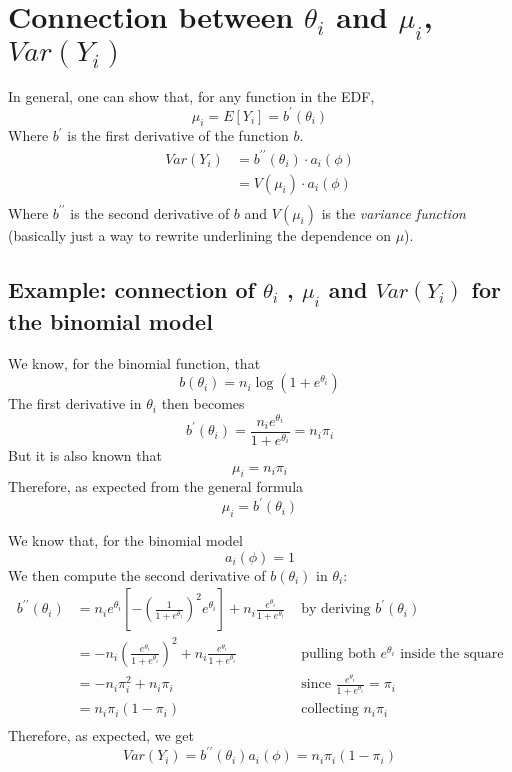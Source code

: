   \section{Connection between \texorpdfstring{$\theta_i$}{thetai} and \texorpdfstring{$\mu_i$}{mui}, \texorpdfstring{$Var(Y_i)$}{varyi}}
    In general, one can show that, for any function in the EDF,
    $$\mu_i = E[Y_i] = b^\prime(\theta_i)$$
    Where $b^\prime$ is the first derivative of the function $b$.
    \begin{align*}
    Var(Y_i) &= b^{\prime\prime}(\theta_i) \cdot a_i(\phi) \\
             &= V(\mu_i) \cdot a_i(\phi) \\
    \end{align*}
    Where $b^{\prime\prime}$ is the second derivative of $b$ and $V(\mu_i)$ is the \textit{variance function} (basically just a way to rewrite underlining the dependence on $\mu$).

    \subsection{Example: connection of \texorpdfstring{$\theta_i$}{thetai} , \texorpdfstring{$\mu_i$ }{mui} and \texorpdfstring{$Var(Y_i)$}{vari} for the binomial model}
      We know, for the binomial function, that
      $$b(\theta_i) = n_i\log(1+e^{\theta_i})$$
      The first derivative in $\theta_i$ then becomes
      $$b^\prime(\theta_i) = \frac{n_ie^{\theta_i}}{1+e^{\theta_i}} = n_i\pi_i$$
      But it is also known that
      $$\mu_i = n_i\pi_i$$
      Therefore, as expected from the general formula
      $$\mu_i = b^\prime(\theta_i)$$
      
      We know that, for the binomial model
      $$a_i(\phi) = 1$$
      We then compute the second derivative of $b(\theta_i)$ in $\theta_i$:
      \begin{align*}
      b^{\prime\prime}(\theta_i) 
        &= n_ie^{\theta_i}\left[-\left(\frac{1}{1+e^{\theta_i}}\right)^2e^{\theta_i}\right] + n_i\frac{e^{\theta_i}}{1+e^{\theta_i}}
        & \text{ by deriving } b^\prime(\theta_i)\\
        &= -n_i\left(\frac{e^{\theta_i}}{1+e^{\theta_i}}\right)^2 + n_i\frac{e^{\theta_i}}{1+e^{\theta_i}}
        & \text{ pulling both } e^{\theta_i} \text{ inside the square}\\
        &= -n_i\pi_i^2+n_i\pi_i
        & \text{ since } \frac{e^{\theta_i}}{1+e^{\theta_i}} = \pi_i\\
        &= n_i\pi_i(1-\pi_i)
        & \text{ collecting } n_i\pi_i\\
      \end{align*}
      Therefore, as expected, we get
      $$Var(Y_i) = b^{\prime\prime}(\theta_i)a_i(\phi) = n_i\pi_i(1-\pi_i)$$

